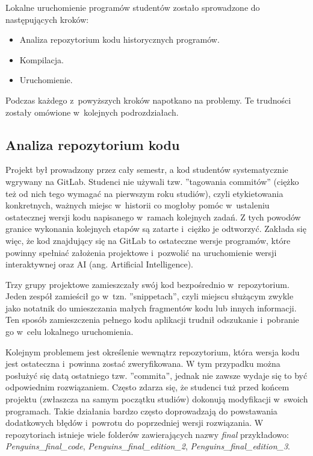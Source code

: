 Lokalne uruchomienie programów studentów zostało sprowadzone do następujących kroków:
\begin{itemize}
    \item Analiza repozytorium kodu historycznych programów.
    \item Kompilacja.
    \item Uruchomienie.
\end{itemize}

Podczas każdego z~powyższych kroków napotkano na problemy.
Te trudności zostały omówione w~kolejnych podrozdziałach.

\subsection{Analiza repozytorium kodu}

Projekt był prowadzony przez cały semestr, a kod studentów systematycznie wgrywany na GitLab.
Studenci nie używali tzw. ”tagowania commitów” (ciężko też od nich tego wymagać na pierwszym roku studiów), czyli etykietowania konkretnych, ważnych miejsc w~historii co mogłoby pomóc w~ustaleniu ostatecznej wersji kodu napisanego w~ramach kolejnych zadań.
Z tych powodów granice wykonania kolejnych etapów są zatarte i~ciężko je odtworzyć.
Zakłada się więc, że kod znajdujący się na GitLab to ostateczne wersje programów, które powinny spełniać założenia projektowe i~pozwolić na uruchomienie wersji interaktywnej oraz AI (ang. Artificial Intelligence).

Trzy grupy projektowe zamieszczały swój kod bezpośrednio w~repozytorium.
Jeden zespół zamieścił go w~tzn. ”snippetach”, czyli miejscu służącym zwykle jako notatnik do umieszczania małych fragmentów kodu lub innych informacji.
Ten sposób zamieszczenia pełnego kodu aplikacji trudnił odszukanie i~pobranie go w~celu lokalnego uruchomienia.

Kolejnym problemem jest określenie wewnątrz repozytorium, która wersja kodu jest ostateczna i~powinna zostać zweryfikowana.
W tym przypadku można posłużyć się datą ostatniego tzw. ”commita”, jednak nie zawsze wydaje się to być odpowiednim rozwiązaniem.
Często zdarza się, że studenci tuż przed końcem projektu (zwłaszcza na samym początku studiów) dokonują modyfikacji w~swoich programach.
Takie działania bardzo często doprowadzają do powstawania dodatkowych błędów i~powrotu do poprzedniej wersji rozwiązania.
W repozytoriach istnieje wiele folderów zawierających nazwy \textit{final} przykładowo: \textit{Penguins\_final\_code}, \textit{Penguins\_final\_edition\_2}, \textit{Penguins\_final\_edition\_3}.

